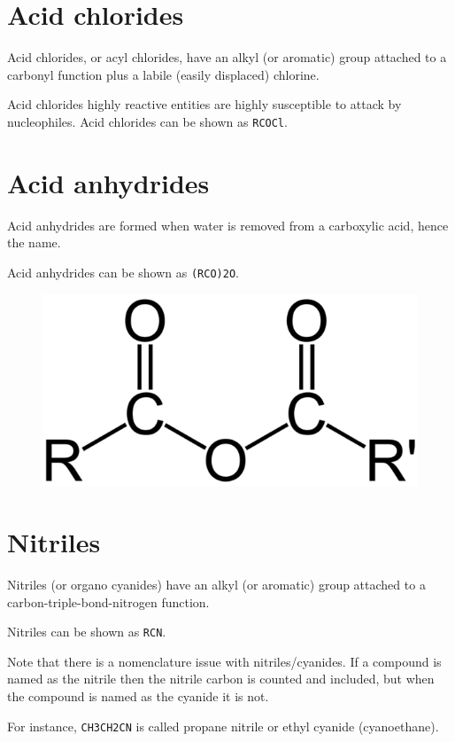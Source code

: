 \documentclass[oneside]{book} %
\theoremstyle{plain}
\begin{document}
\section{Acid chlorides}
Acid chlorides, or acyl chlorides, have an alkyl (or aromatic) group attached to
a carbonyl function plus a labile (easily displaced) chlorine.

Acid chlorides highly reactive entities are highly susceptible to attack by
nucleophiles.
Acid chlorides can be shown as \texttt{RCOCl}.

\section{Acid anhydrides}
Acid anhydrides are formed when water is removed from a carboxylic acid, hence
the name.

Acid anhydrides can be shown as \texttt{(RCO)2O}.

\begin{figure}[ht]
\includegraphics[scale=0.2]{carboxylic-acid-anhydride.png}
\centering
\end{figure}

\section{Nitriles}
Nitriles (or organo cyanides) have an alkyl (or aromatic) group attached to a
carbon-triple-bond-nitrogen function.

Nitriles can be shown as \texttt{RCN}.

Note that there is a nomenclature issue with nitriles/cyanides. If a compound is
named as the nitrile then the nitrile carbon is counted and included, but when
the compound is named as the cyanide it is not.

For instance, \texttt{CH3CH2CN} is called propane nitrile or ethyl cyanide
(cyanoethane).
\end{document}
